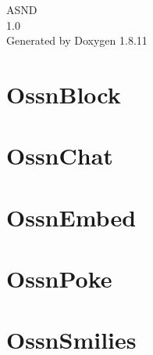 \documentclass[twoside]{book}
\newcommand{\+}{\discretionary{\mbox{\scriptsize$\hookleftarrow$}}{}{}}
\newcommand{\clearemptydoublepage}{%
  \newpage{\pagestyle{empty}\cleardoublepage}%
}
\begin{document}
\hypersetup{pageanchor=false,
             bookmarksnumbered=true,
             pdfencoding=unicode
            }
\begin{titlepage}
\vspace*{7cm}
\begin{center}%
{\Large A\+S\+ND \\[1ex]\large 1.\+0 }\\
\vspace*{1cm}
{\large Generated by Doxygen 1.8.11}\\
\end{center}
\end{titlepage}
\clearemptydoublepage
\tableofcontents
\clearemptydoublepage
{}
\hypersetup{pageanchor=true}

\chapter{Ossn\+Block}
\label{md__home_jj_Projects_ASN_components_OssnBlock_README}
\hypertarget{md__home_jj_Projects_ASN_components_OssnBlock_README}{}

\chapter{Ossn\+Chat}
\label{md__home_jj_Projects_ASN_components_OssnChat_README}
\hypertarget{md__home_jj_Projects_ASN_components_OssnChat_README}{}

\chapter{Ossn\+Embed}
\label{md__home_jj_Projects_ASN_components_OssnEmbed_README}
\hypertarget{md__home_jj_Projects_ASN_components_OssnEmbed_README}{}

\chapter{Ossn\+Poke}
\label{md__home_jj_Projects_ASN_components_OssnPoke_README}
\hypertarget{md__home_jj_Projects_ASN_components_OssnPoke_README}{}

\chapter{Ossn\+Smilies}
\label{md__home_jj_Projects_ASN_components_OssnSmilies_README}
\hypertarget{md__home_jj_Projects_ASN_components_OssnSmilies_README}{}

\end{document}

